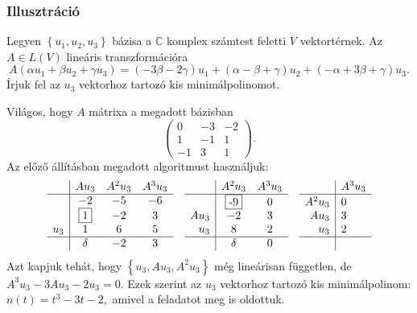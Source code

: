 \documentclass[9pt, a4paper, showtrims]{memoir}
\theoremstyle{plain}
\theoremstyle{remark}
\theoremstyle{definition}
\begin{document}
\subsubsection{Illusztráció}\label{se:kisminimalillusztracio}
Legyen $\left\{ u_1,u_2,u_3 \right\}$ bázisa a $\mathbb{C}$ komplex számtest feletti $V$ vektortérnek.
Az $A\in L\left( V \right)$ lineáris transzformációra
\[
    A\left( \alpha u_1+\beta u_2 +\gamma u_3 \right)
    =
    \left( -3\beta -2\gamma \right)u_1 +
    \left( \alpha-\beta+\gamma \right)u_2+
    \left( -\alpha+3\beta+\gamma \right)u_3.
\]
Írjuk fel az $u_3$ vektorhoz tartozó kis minimálpolinomot.

Világos, hogy $A$ mátrixa a megadott bázisban
\[
    \begin{pmatrix}
        0&-3&-2\\
        1&-1&1\\
        -1&3&1
    \end{pmatrix}.
\]
Az előző állításban megadott algoritmust használjuk:
\[
\begin{array}{r|ccc}
	     & Au_3        & A^2u_3 & A^3u_3\\
	\hline
	     & -2          &     -5 &     -6\\
         &\framebox{1} &     -2 &      3\\
	u_3  &  1          &      6 &      5\\
	\hline
	     &\delta       &     -2 &      3
\end{array}
\quad
\begin{array}{r|cc}
	     &  A^2u_3      & A^3u_3\\
	\hline
        &\framebox{-9} &     0 \\
	Au_3 &      -2      &     3 \\
	u_3  &       8      &     2 \\
	\hline
	     &\delta        &     0
\end{array}
\quad
\begin{array}{r|l}
	     &A^3u_3\\
	\hline
   A^2u_3&    0 \phantom{\framebox{0}}\\
	Au_3 &    3 \\
	u_3  &    2 \\
	\hline
         &\phantom{\delta}
\end{array}
\]
Azt kapjuk tehát, hogy
\(
	\left\{ u_3,Au_3,A^2u_3\right\}
    \)
még lineárisan független, de
\(
A^3u_3-3Au_3-2u_3=0.
\)
Ezek szerint az $u_3$ vektorhoz tartozó kis minimálpolinom:
\(
n\left( t \right)=t^3-3t-2,
\)
amivel a feladatot meg is oldottuk.
\end{document}
